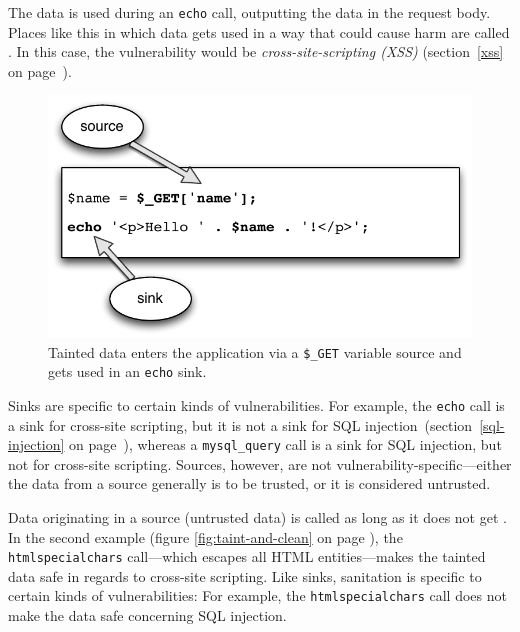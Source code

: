 The data is used during an \texttt{echo} call, outputting the data in the request body. Places like this in which data gets used in a way that could cause harm are called . In this case, the vulnerability would be \emph{cross-site-scripting (XSS)} (section~\ref{xss} on page~\pageref{xss}).

\begin{figure}[htb]
  \begin{center}
    \includegraphics[scale=0.75]{images/taint}
    \caption{Tainted data enters the application via a \texttt{\$\_GET} variable source and gets used in an \texttt{echo} sink.}
    \label{fig:taint}
  \end{center}
\end{figure}

Sinks are specific to certain kinds of vulnerabilities. For example, the \texttt{echo} call is a sink for cross-site scripting, but it is not a sink for SQL injection~(section~\ref{sql-injection} on page~\pageref{sql-injection}), whereas a \texttt{mysql\_query} call is a sink for SQL injection, but not for cross-site scripting. Sources, however, are not vulnerability-specific---either the data from a source generally is to be trusted, or it is considered untrusted.

Data originating in a source (\ie untrusted data) is called  as long as it does not get . In the second example (figure \ref{fig:taint-and-clean} on page \pageref{fig:taint-and-clean}), the \texttt{htmlspecialchars} call---which escapes all HTML entities---makes the tainted data safe in regards to cross-site scripting. Like sinks, sanitation is specific to certain kinds of vulnerabilities: For example, the \texttt{htmlspecialchars} call does not make the data safe concerning SQL injection.

